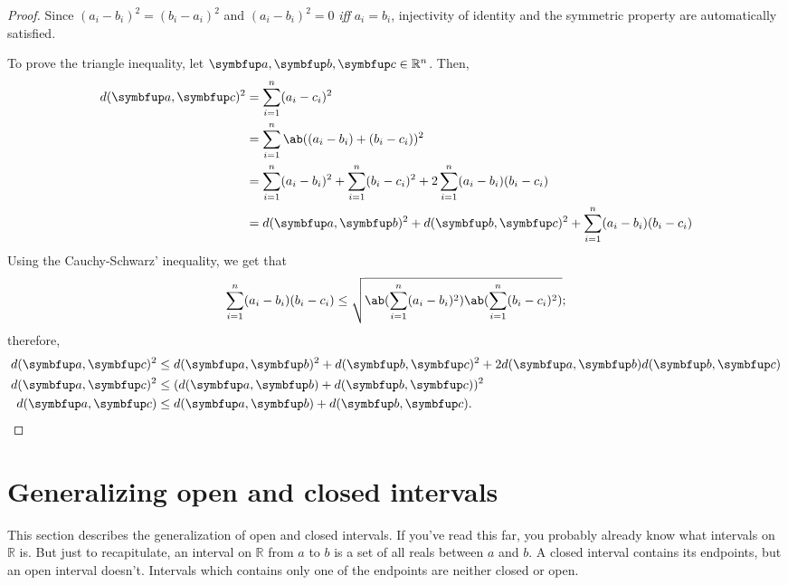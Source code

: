 \begin{proof}
  Since \((a_i - b_i)^2 = (b_i - a_i)^2\) and \((a_i - b_i)^2 = 0\) \emph{iff}
  \(a_i = b_i\), injectivity of identity and the symmetric property are automatically satisfied.

  To prove the triangle inequality, let \(\vv{a}, \vv{b}, \vv{c} \in \mathbb{R}^n\). Then,
  \begin{align}
    d(\vv{a}, \vv{c})^2 & = \sum_{i=1}^n (a_i - c_i)^2                                                                     \\
                        & = \sum_{i=1}^n \ab((a_i - b_i) + (b_i - c_i))^2                                                  \\
                        & = \sum_{i=1}^n (a_i - b_i)^2 + \sum_{i=1}^n (b_i - c_i)^2 + 2\sum_{i=1}^n (a_i - b_i)(b_i - c_i) \\
                        & = d(\vv{a}, \vv{b})^2 + d(\vv{b}, \vv{c})^2 + \sum_{i=1}^n (a_i - b_i)(b_i - c_i)
  \end{align}
  Using the Cauchy-Schwarz' inequality, we get that
  \begin{equation}
    \sum_{i=1}^n (a_i - b_i)(b_i - c_i) \leq \sqrt{\ab(\sum_{i=1}^n (a_i - b_i)^2) \ab(\sum_{i=1}^n (b_i - c_i)^2)};
  \end{equation}
  therefore,
  \begin{align}
    d(\vv{a}, \vv{c})^2 & \leq d(\vv{a}, \vv{b})^2 + d(\vv{b}, \vv{c})^2 + 2 d(\vv{a}, \vv{b}) d(\vv{b}, \vv{c}) \\
    d(\vv{a}, \vv{c})^2 & \leq (d(\vv{a}, \vv{b}) + d(\vv{b}, \vv{c}))^2                                         \\
    d(\vv{a}, \vv{c})   & \leq d(\vv{a}, \vv{b}) + d(\vv{b}, \vv{c}). \qedhere
  \end{align}
\end{proof}

\section{Generalizing open and closed intervals}

This section describes the generalization of open and closed intervals. If you've read this far,
you probably already know what intervals on \(\mathbb{R}\) is. But just to
recapitulate, an interval on \(\mathbb{R}\) from \(a\) to \(b\) is a set of all reals between \(a\)
and \(b\). A closed interval contains its endpoints, but an open interval doesn't.
Intervals which contains only one of the endpoints are neither closed or open.


